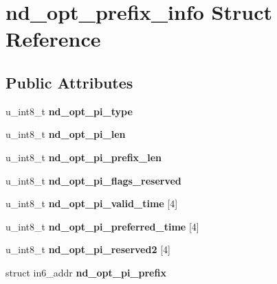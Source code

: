 \hypertarget{structnd__opt__prefix__info}{
\section{nd\_\-opt\_\-prefix\_\-info Struct Reference}
\label{structnd__opt__prefix__info}
}
\subsection*{Public Attributes}
\begin{DoxyCompactItemize}
\item 
\hypertarget{structnd__opt__prefix__info_a13b53d1d91aae9803c63b0832f8cf56e}{
u\_\-int8\_\-t {\bfseries nd\_\-opt\_\-pi\_\-type}}
\label{structnd__opt__prefix__info_a13b53d1d91aae9803c63b0832f8cf56e}

\item 
\hypertarget{structnd__opt__prefix__info_a766f2c0c31402b31b9a652596f1c1c1f}{
u\_\-int8\_\-t {\bfseries nd\_\-opt\_\-pi\_\-len}}
\label{structnd__opt__prefix__info_a766f2c0c31402b31b9a652596f1c1c1f}

\item 
\hypertarget{structnd__opt__prefix__info_a086c81fa05b8156884eb8899995095fd}{
u\_\-int8\_\-t {\bfseries nd\_\-opt\_\-pi\_\-prefix\_\-len}}
\label{structnd__opt__prefix__info_a086c81fa05b8156884eb8899995095fd}

\item 
\hypertarget{structnd__opt__prefix__info_aeb15aeea2cebfaec6d875ca0c1231520}{
u\_\-int8\_\-t {\bfseries nd\_\-opt\_\-pi\_\-flags\_\-reserved}}
\label{structnd__opt__prefix__info_aeb15aeea2cebfaec6d875ca0c1231520}

\item 
\hypertarget{structnd__opt__prefix__info_aec648ea1073a2586973e0b48426731f6}{
u\_\-int8\_\-t {\bfseries nd\_\-opt\_\-pi\_\-valid\_\-time} \mbox{[}4\mbox{]}}
\label{structnd__opt__prefix__info_aec648ea1073a2586973e0b48426731f6}

\item 
\hypertarget{structnd__opt__prefix__info_a7a99fcbb225ede2350f9699c5c252be9}{
u\_\-int8\_\-t {\bfseries nd\_\-opt\_\-pi\_\-preferred\_\-time} \mbox{[}4\mbox{]}}
\label{structnd__opt__prefix__info_a7a99fcbb225ede2350f9699c5c252be9}

\item 
\hypertarget{structnd__opt__prefix__info_ab3dae983e1e5833dcf65fd3d8031ad53}{
u\_\-int8\_\-t {\bfseries nd\_\-opt\_\-pi\_\-reserved2} \mbox{[}4\mbox{]}}
\label{structnd__opt__prefix__info_ab3dae983e1e5833dcf65fd3d8031ad53}

\item 
\hypertarget{structnd__opt__prefix__info_ad198dd5414633a38b4d56ceceb13a4a7}{
struct in6\_\-addr {\bfseries nd\_\-opt\_\-pi\_\-prefix}}
\label{structnd__opt__prefix__info_ad198dd5414633a38b4d56ceceb13a4a7}

\end{DoxyCompactItemize}


